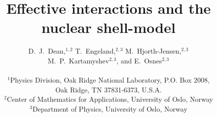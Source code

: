 \documentclass[twoside,12pt]{article}
\begin{document}
\title{Effective interactions and the nuclear shell-model}
\author{D.~J.~Dean,$^{1,2}$ T.~Engeland,$^{2,3}$ M.~Hjorth-Jensen,$^{2,3}$\\
M.~P.~Kartamyshev$^{2,3}$, and E.~Osnes$^{2,3}$\\
\\
$^{1}$Physics Division, Oak Ridge National Laboratory,
P.O. Box 2008,\\  Oak Ridge, TN 37831-6373, U.S.A.\\
$^{2}$Center of Mathematics for Applications, University of Oslo, Norway\\
$^{3}$Department of Physics, University of Oslo, Norway}

\maketitle
\end{document}
